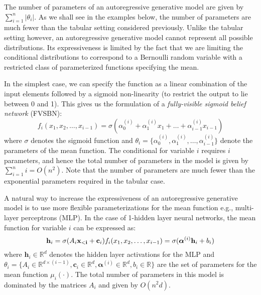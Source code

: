 The number of parameters of an autoregressive generative model are given by $\sum_{i=1}^n \vert \theta_i \vert$. As we shall see in the examples below, the number of parameters are much fewer than the tabular setting considered previously. Unlike the tabular setting however, an autoregressive generative model cannot represent all possible distributions. Its expressiveness is limited by the fact that we are limiting the conditional distributions to correspond to a Bernoulli random variable with a restricted class of parameterized functions specifying the mean.

In the simplest case, we can specify the function as a linear combination of the input elements followed by a sigmoid non-linearity (to restrict the output to lie between 0 and 1). This gives us the formulation of a \textit{fully-visible sigmoid belief network} (FVSBN):
\[
f_i(x_1, x_2, \ldots, x_{i-1}) =\sigma(\alpha^{(i)}_0 + \alpha^{(i)}_1 x_1 + \ldots + \alpha^{(i)}_{i-1} x_{i-1})  
\]
where $\sigma$ denotes the sigmoid function and $\theta_i=\{\alpha^{(i)}_0,\alpha^{(i)}_1, \ldots, \alpha^{(i)}_{i-1}\}$ denote the parameters of the mean function. The conditional for variable $i$ requires $i$
 parameters, and hence the total number of parameters in the model is given by $\sum_{i=1}^ni= O(n^2)$.  Note that the number of parameters are much fewer than the exponential parameters required in the tabular case.

A natural way to increase the expressiveness of an autoregressive generative model is to use more flexible parameterizations for the mean function e.g., multi-layer perceptrons (MLP). In the case of 1-hidden layer neural networks, the mean function for variable $i$ can be expressed as:
\[
\mathbf{h}_i = \sigma(A_i \mathbf{x_{<i}} + \mathbf{c}_i)\\
f_i(x_1, x_2, \ldots, x_{i-1}) =\sigma(\boldsymbol{\alpha}^{(i)}\mathbf{h}_i +b_i )  
\]
where $\mathbf{h}_i \in \mathbb{R}^d$ denotes the hidden layer activations for the MLP and$\theta_i = \{A_i \in \mathbb{R}^{d\times (i-1)},  \mathbf{c}_i \in \mathbb{R}^d, \boldsymbol{\alpha}^{(i)}\in \mathbb{R}^d, b_i \in \mathbb{R}\}$ are the set of parameters for the mean function $\mu_i(\cdot)$.  The total number of parameters in this model is dominated by the matrices $A_i$ and given by $O(n^2 d)$. 


